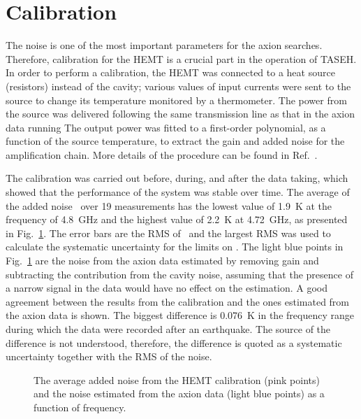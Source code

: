 \section{Calibration}
\label{sec:calibration}

The noise is one of the most important 
parameters for the axion searches. Therefore, calibration for the HEMT is a 
crucial part in the operation of TASEH. In order to perform a calibration, 
the HEMT was connected to a heat source (resistors) instead of the cavity; 
various values of input currents were sent to the source to change its 
temperature monitored by a thermometer. The power from the source 
was delivered following the same transmission line as that in the axion 
data running
The output power was fitted to a first-order polynomial, as a function of the source temperature, 
to extract the gain and added noise for the amplification chain. More details of the 
procedure can be found in Ref.~\cite{TASEHInstrumentation}. 

The calibration was carried out before, 
during, and after the data taking, which showed that the performance of the system
was stable over time. The average of the added noise \ta\ over 19 measurements 
has the lowest value of 1.9~K at the frequency of 4.8~GHz and the highest value of 
2.2~K at 4.72~GHz, as presented in Fig.~\ref{fig:hemtcalvsf}. 
The error bars are the RMS of \ta\ and the largest RMS was used to calculate 
the systematic uncertainty for the limits on \gagg. The light blue points in 
Fig.~\ref{fig:hemtcalvsf} are the noise from the axion data estimated by 
removing gain and subtracting the contribution from the cavity noise, assuming 
that the presence of a narrow signal in the data would have no effect on the 
estimation. A good agreement between the results from the calibration  
and the ones estimated from the axion data is shown. The biggest 
difference is 0.076~K in the frequency range during which the data were 
recorded after an earthquake. The source of the difference is not understood, 
therefore, the difference is quoted as a systematic uncertainty together 
with the RMS of the noise.

\begin{figure} [htbp]
  \centering
  \caption{The average added noise from the HEMT calibration (pink points) and 
 the noise estimated from the axion data (light blue points) as a function of frequency.}
  \label{fig:hemtcalvsf}
\end{figure}


  

